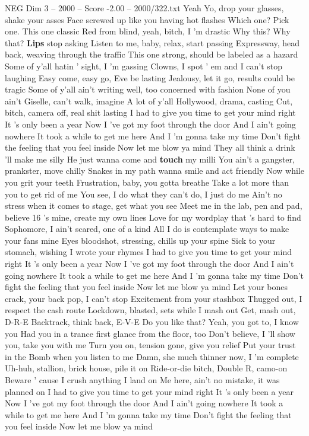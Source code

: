 \begin{textsample}{NEG Dim 3 – 2000 – Score -2.00 – 2000/322.txt}  \label{ex:f3_neg_006}
Yeah Yo, drop your glasses, shake your asses Face screwed up like you having hot flashes Which one?
Pick one.
This one classic Red from blind, yeah, bitch, I 'm drastic Why this?
Why that? \textbf{Lips} stop asking Listen to me, baby, relax, start passing Expressway, head back, weaving through the traffic This one strong, should be labeled as a hazard Some of y'all hatin ' sight, I 'm gassing Clowns, I spot ' em and I can't stop laughing Easy come, easy go, Eve be lasting Jealousy, let it go, results could be tragic Some of y'all ain't writing well, too concerned with fashion None of you ain't Giselle, can't walk, imagine A lot of y'all Hollywood, drama, casting Cut, bitch, camera off, real shit lasting I had to give you time to get your mind right It 's only been a year Now I 've got my foot through the door And I ain't going nowhere It took a while to get me here And I 'm gonna take my time Don't fight the feeling that you feel inside Now let me blow ya mind They all think a drink 'll make me silly He just wanna come and \textbf{touch} my milli You ain't a gangster, prankster, move chilly Snakes in my path wanna smile and act friendly Now while you grit your teeth Frustration, baby, you gotta breathe Take a lot more than you to get rid of me You see, I do what they can't do, I just do me Ain't no stress when it comes to stage, get what you see Meet me in the lab, pen and pad, believe 16 's mine, create my own lines Love for my wordplay that 's hard to find Sophomore, I ain't scared, one of a kind All I do is contemplate ways to make your fans mine Eyes bloodshot, stressing, chills up your spine Sick to your stomach, wishing I wrote your rhymes I had to give you time to get your mind right It 's only been a year Now I 've got my foot through the door And I ain't going nowhere It took a while to get me here And I 'm gonna take my time Don't fight the feeling that you feel inside Now let me blow ya mind Let your bones crack, your back pop, I can't stop Excitement from your stashbox Thugged out, I respect the cash route Lockdown, blasted, sets while I mash out Get, mash out, D-R-E Backtrack, think back, E-V-E Do you like that?
Yeah, you got to, I know you Had you in a trance first glance from the floor, too Don't believe, I 'll show you, take you with me Turn you on, tension gone, give you relief Put your trust in the Bomb when you listen to me Damn, she much thinner now, I 'm complete Uh-huh, stallion, brick house, pile it on Ride-or-die bitch, Double R, camo-on Beware ' cause I crush anything I land on Me here, ain't no mistake, it was planned on I had to give you time to get your mind right It 's only been a year Now I 've got my foot through the door And I ain't going nowhere It took a while to get me here And I 'm gonna take my time Don't fight the feeling that you feel inside Now let me blow ya mind

\end{textsample}

